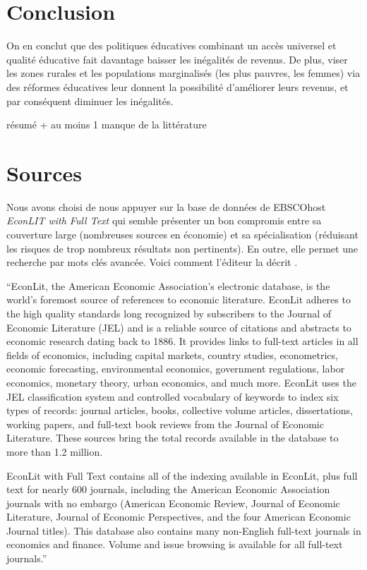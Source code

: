 \documentclass[pagesize, twoside=off, bibliography=totoc, DIV=calc, fontsize=12pt, a4paper, french]{scrartcl}
\begin{document}
\section{Conclusion}

\label{sec_conc}

On en conclut que des politiques éducatives combinant un accès universel et qualité éducative fait davantage baisser les inégalités de revenus. De plus, viser les zones rurales et les populations marginalisés (les plus pauvres, les femmes) via des réformes éducatives leur donnent la possibilité d’améliorer leurs revenus, et par conséquent diminuer les inégalités.

résumé + au moins 1 manque de la littérature

\appendix
\section{Sources}
\label{sec_search}
Nous avons choisi de nous appuyer sur la base de données de EBSCOhost \emph{EconLIT with Full Text} qui semble présenter un bon compromis entre sa couverture large (nombreuses sources en économie) et sa spécialisation (réduisant les risques de trop nombreux résultats non pertinents). En outre, elle permet une recherche par mots clés avancée.
Voici comment l’éditeur la décrit \citep{ebscohost_econlit_2024}.

“EconLit, the American Economic Association's electronic database, is the world's foremost source of references to economic literature. EconLit adheres to the high quality standards long recognized by subscribers to the Journal of Economic Literature (JEL) and is a reliable source of citations and abstracts to economic research dating back to 1886. It provides links to full-text articles in all fields of economics, including capital markets, country studies, econometrics, economic forecasting, environmental economics, government regulations, labor economics, monetary theory, urban economics, and much more. EconLit uses the JEL classification system and controlled vocabulary of keywords to index six types of records: journal articles, books, collective volume articles, dissertations, working papers, and full-text book reviews from the Journal of Economic Literature. These sources bring the total records available in the database to more than 1.2 million.

EconLit with Full Text contains all of the indexing available in EconLit, plus full text for nearly 600 journals, including the American Economic Association journals with no embargo (American Economic Review, Journal of Economic Literature, Journal of Economic Perspectives, and the four American Economic Journal titles). This database also contains many non-English full-text journals in economics and finance. Volume and issue browsing is available for all full-text journals.”
\end{document}
